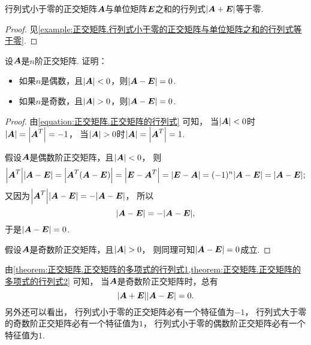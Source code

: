 \begin{proposition}\label{theorem:正交矩阵.正交矩阵的多项式的行列式1}
行列式小于零的正交矩阵\(\boldsymbol{A}\)与单位矩阵\(\boldsymbol{E}\)之和的行列式\(\abs{\boldsymbol{A}+\boldsymbol{E}}\)等于零.
\begin{proof}
见\cref{example:正交矩阵.行列式小于零的正交矩阵与单位矩阵之和的行列式等于零}.
\end{proof}
\end{proposition}
\begin{proposition}\label{theorem:正交矩阵.正交矩阵的多项式的行列式2}
设\(\boldsymbol{A}\)是\(n\)阶正交矩阵.
证明：\begin{itemize}
	\item 如果\(n\)是偶数，且\(\abs{\boldsymbol{A}}<0\)，则\(\abs{\boldsymbol{A}-\boldsymbol{E}} = 0\).
	\item 如果\(n\)是奇数，且\(\abs{\boldsymbol{A}}>0\)，则\(\abs{\boldsymbol{A}-\boldsymbol{E}} = 0\).
\end{itemize}
\begin{proof}
由\cref{equation:正交矩阵.正交矩阵的行列式} 可知，
当\(\abs{\boldsymbol{A}}<0\)时\(\abs{\boldsymbol{A}}=\abs{\boldsymbol{A}^T}=-1\)，
当\(\abs{\boldsymbol{A}}>0\)时\(\abs{\boldsymbol{A}}=\abs{\boldsymbol{A}^T}=1\).

假设\(\boldsymbol{A}\)是偶数阶正交矩阵，且\(\abs{\boldsymbol{A}}<0\)，
则\begin{align*}
	\abs{\boldsymbol{A}^T} \abs{\boldsymbol{A}-\boldsymbol{E}}
	= \abs{\boldsymbol{A}^T (\boldsymbol{A}-\boldsymbol{E})}
	= \abs{\boldsymbol{E}-\boldsymbol{A}^T}
	= \abs{\boldsymbol{E}-\boldsymbol{A}}
	= (-1)^n \abs{\boldsymbol{A}-\boldsymbol{E}}
	= \abs{\boldsymbol{A}-\boldsymbol{E}};
\end{align*}
又因为\(\abs{\boldsymbol{A}^T} \abs{\boldsymbol{A}-\boldsymbol{E}} = -\abs{\boldsymbol{A}-\boldsymbol{E}}\)，
所以\begin{equation*}
	\abs{\boldsymbol{A}-\boldsymbol{E}}
	= -\abs{\boldsymbol{A}-\boldsymbol{E}},
\end{equation*}
于是\(\abs{\boldsymbol{A}-\boldsymbol{E}} = 0\).

假设\(\boldsymbol{A}\)是奇数阶正交矩阵，且\(\abs{\boldsymbol{A}}>0\)，
则同理可知\(\abs{\boldsymbol{A}-\boldsymbol{E}} = 0\)成立.
\end{proof}
\end{proposition}
\begin{remark}
由\cref{theorem:正交矩阵.正交矩阵的多项式的行列式1,theorem:正交矩阵.正交矩阵的多项式的行列式2} 可知，
当\(\boldsymbol{A}\)是奇数阶正交矩阵时，总有\begin{equation*}
	\abs{\boldsymbol{A}+\boldsymbol{E}} \abs{\boldsymbol{A}-\boldsymbol{E}} = 0.
\end{equation*}
另外还可以看出，
行列式小于零的正交矩阵必有一个特征值为\(-1\)，
行列式大于零的奇数阶正交矩阵必有一个特征值为\(1\)，
行列式小于零的偶数阶正交矩阵必有一个特征值为\(1\).
\end{remark}
